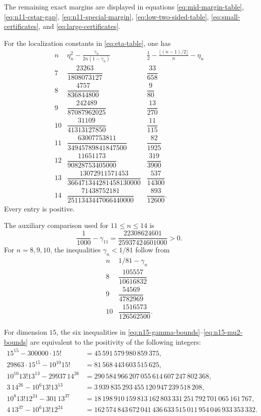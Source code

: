 \documentclass[11pt]{article}
\theoremstyle{definition}
\newcommand{\1}{\mathbf{1}}
\begin{document}
The remaining exact margins are displayed in equations
\eqref{eq:mid-margin-table}, \eqref{eq:n11-cstar-gap},
\eqref{eq:n11-special-margin}, \eqref{eq:low-two-sided-table},
\eqref{eq:small-certificates}, and \eqref{eq:large-certificates}.

For the localization constants in \eqref{eq:eta-table}, one has
\[
\begin{array}{c|c|c}
 n&\displaystyle
 \eta_n^2-\frac{\gamma_n}{2n(1-\gamma_n)}
 &\displaystyle
 \frac12-\frac{\lfloor(n-1)/2\rfloor}{n}-\eta_n\\ \hline
 7&\dfrac{23263}{1808073127}&\dfrac{33}{658}\\[3mm]
 8&\dfrac{4757}{836844800}&\dfrac9{80}\\[3mm]
 9&\dfrac{242489}{87087962025}&\dfrac{13}{270}\\[3mm]
 10&\dfrac{31109}{41313127850}&\dfrac{11}{115}\\[3mm]
 11&\dfrac{63007753811}{34945789841847500}&\dfrac{82}{1925}\\[3mm]
 12&\dfrac{11651173}{90828753405000}&\dfrac{319}{3900}\\[3mm]
 13&\dfrac{13072911571453}{366471344281458130000}&\dfrac{537}{14300}\\[3mm]
 14&\dfrac{71438752181}{2511343447066440000}&\dfrac{893}{12600}.
\end{array}
\tag{A.2}\label{eq:localization-certificates}
\]
Every entry is positive.

The auxiliary comparison used for $11\le n\le14$ is
\[
 \frac1{1000}-\gamma_{11}
 =\frac{22308624601}{25937424601000}>0.
 \tag{A.3}\label{eq:gamma11-small}
\]
For $n=8,9,10$, the inequalities $\gamma_n<1/81$ follow from
\[
\begin{array}{c|c}
 n&1/81-\gamma_n\\ \hline
 8&\dfrac{105557}{10616832}\\[2mm]
 9&\dfrac{54569}{4782969}\\[2mm]
 10&\dfrac{1516573}{126562500}.
\end{array}
\tag{A.4}\label{eq:gamma-low-small}
\]

For dimension $15$, the six inequalities in \eqref{eq:n15-gamma-bounds}--\eqref{eq:n15-mu2-bounds} are equivalent to the positivity of the following integers:
\[
\begin{aligned}
15^{15}-300000\cdot15!
 &=45\,591\,579\,980\,859\,375,\\
29863\cdot15^{15}-10^{10}15!
 &=81\,568\,443\,603\,515\,625,\\
10^{10}13!13^{13}-29937\,14^{26}
 &=290\,584\,966\,207\,055\,614\,607\,247\,802\,368,\\
3\,14^{26}-10^6 13!13^{13}
 &=3\,939\,835\,293\,455\,120\,947\,239\,518\,208,\\
10^8 13!12^{24}-301\,13^{37}
 &=18\,198\,910\,159\,813\,162\,803\,331\,251\,792\,701\,065\,161\,767,\\
4\,13^{37}-10^6 13!12^{24}
 &=162\,574\,843\,672\,041\,436\,633\,515\,011\,954\,046\,933\,353\,332.
\end{aligned}
\tag{A.5}\label{eq:n15-integers}
\]
\end{document}
